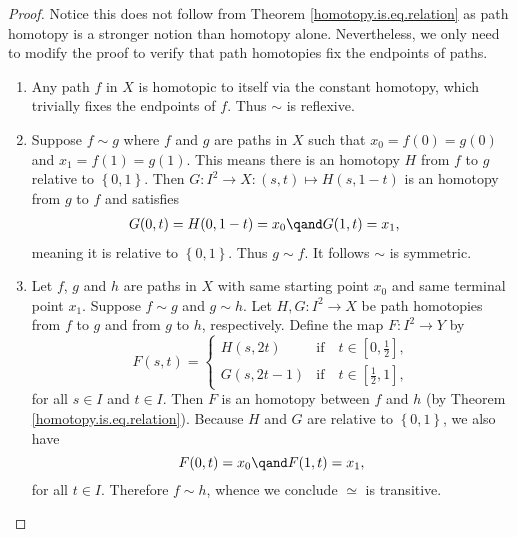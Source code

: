 \begin{proof} Notice this does not follow from Theorem \ref{homotopy.is.eq.relation} as path homotopy is a stronger notion than homotopy alone. Nevertheless, we only need to modify the proof to verify that path homotopies fix the endpoints of paths.
\begin{enumerate}[label=(\roman*)]
    \item Any path \(f\) in \(X\) is homotopic to itself via the constant homotopy, which trivially fixes the endpoints of \(f\). Thus \(\sim\) is reflexive.
    \item Suppose \(f\sim g\) where \(f\) and \(g\) are paths in \(X\) such that \(x_0 = f(0) = g(0)\) and \(x_1=f(1)=g(1)\). This means  there is an homotopy \(H\) from \(f\) to \(g\) relative to \(\left\{ 0,1 \right\}\). Then \(G\colon   I^2 \to X: (s,t)\mapsto H(s,1-t)\) is an homotopy from \(g\) to \(f\)   and satisfies 
    \begin{align*}
        G(0,t) &= H(0,1-t) =  x_0 \qand G(1,t) = x_1,
    \end{align*}
    meaning it is relative to \(\left\{ 0,1 \right\}\). Thus \(g\sim f\). It follows   \(\sim\) is symmetric.

    \item Let \(f\), \(g\) and \(h\) are paths in \(X\) with same starting point \(x_0\) and same terminal point \(x_1\). Suppose \(f\sim g\) and \(g\sim h\). Let \(H,G\colon  I^2 \to X\) be path  homotopies from \(f\) to \(g\) and from \(g\) to \(h\), respectively. Define the map \(F\colon  I^2 \to  Y\) by \[
        F(s,t) = \begin{cases}
            H(s,2t)     & \text{if}\quad t\in [0,\frac{1}{2}],\\
            G(s,2t -1)  & \text{if}\quad t\in [\frac{1}{2},1],
        \end{cases}
    \] for all \(s\in I\) and \(t\in I\). Then \(F\) is an homotopy between \(f\) and \(h\) (by Theorem \ref{homotopy.is.eq.relation}). Because \(H\) and \(G\) are relative to \(\left\{ 0,1 \right\}\), we also have 
    \[F(0,t) =    x_0 \qand F(1,t) = x_1,\]
    for all \(t\in I\). Therefore \(f\sim h\), whence we conclude  \(\simeq\) is transitive.
\end{enumerate}
    
    


\end{proof}
